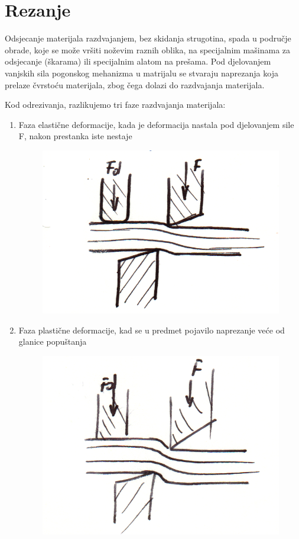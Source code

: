 \documentclass[a4paper,12pt]{article}
\numberwithin{figure}{section}
\begin{document}
\section{Rezanje}
Odsjecanje materijala razdvajanjem, bez skidanja strugotina, spada u područje obrade, koje se može vršiti noževim raznih oblika, na specijalnim mašinama za odsjecanje (škarama) ili specijalnim alatom na prešama. Pod djelovanjem vanjskih sila pogonskog mehanizma u matrijalu se stvaraju naprezanja koja prelaze čvrstoću materijala, zbog čega dolazi do razdvajanja materijala. \par
Kod odrezivanja, razlikujemo tri faze razdvajanja materijala:
\begin{enumerate}
\item Faza elastične deformacije, kada je deformacija nastala pod djelovanjem sile F, nakon prestanka iste nestaje
\begin{figure}[!h]
\centering
\includegraphics[scale=0.15]{image_53-1.png}
\end{figure}
\FloatBarrier
\item Faza plastične deformacije, kad se u predmet pojavilo naprezanje veće od glanice popuštanja
\begin{figure}[!h]
\centering
\includegraphics[scale=0.15]{image_53-2.png}

\end{figure}
\end{enumerate}
\end{document}
